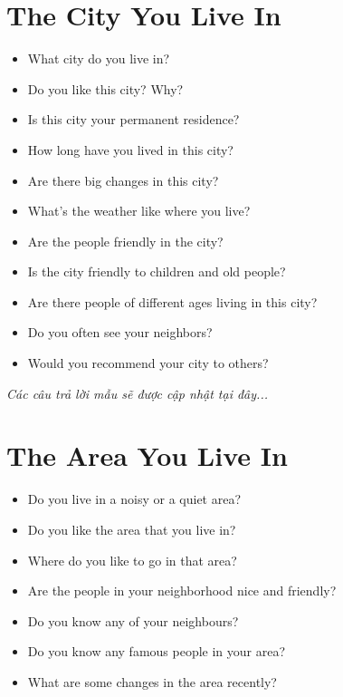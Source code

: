\section{The City You Live In}
\begin{ieltsprompt}
\begin{itemize}[itemsep=4pt]
    \item What city do you live in?
    \item Do you like this city? Why?
    \item Is this city your permanent residence?
    \item How long have you lived in this city?
    \item Are there big changes in this city?
    \item What's the weather like where you live?
    \item Are the people friendly in the city?
    \item Is the city friendly to children and old people?
    \item Are there people of different ages living in this city?
    \item Do you often see your neighbors?
    \item Would you recommend your city to others?
\end{itemize}
\end{ieltsprompt}

\vspace{1em}
\textit{Các câu trả lời mẫu sẽ được cập nhật tại đây...}
\vspace{2em}

\section{The Area You Live In}
\begin{ieltsprompt}
\begin{itemize}[itemsep=4pt]
    \item Do you live in a noisy or a quiet area?
    \item Do you like the area that you live in?
    \item Where do you like to go in that area?
    \item Are the people in your neighborhood nice and friendly?
    \item Do you know any of your neighbours?
    \item Do you know any famous people in your area?
    \item What are some changes in the area recently?
\end{itemize}
\end{ieltsprompt}

